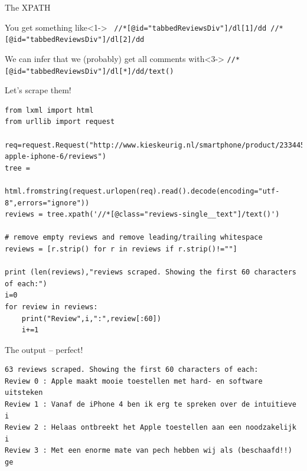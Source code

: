\documentclass{beamer}
\begin{document}
\begin{frame}{The XPATH}
\begin{block}{You get something like}<1->
{\tt{
//*[@id="tabbedReviewsDiv"]/dl[1]/dd
//*[@id="tabbedReviewsDiv"]/dl[2]/dd
}}
\end{block}
\begin{block}{We can infer that we (probably) get all comments with}<3->
{\tt{//*[@id="tabbedReviewsDiv"]/dl[*]/dd/text()}}
\end{block}
\end{frame}




\begin{frame}[fragile]{Let's scrape them!}
\begin{lstlisting}
from lxml import html
from urllib import request

req=request.Request("http://www.kieskeurig.nl/smartphone/product/2334455-apple-iphone-6/reviews")
tree = 

html.fromstring(request.urlopen(req).read().decode(encoding="utf-8",errors="ignore"))        
reviews = tree.xpath('//*[@class="reviews-single__text"]/text()')

# remove empty reviews and remove leading/trailing whitespace
reviews = [r.strip() for r in reviews if r.strip()!=""]

print (len(reviews),"reviews scraped. Showing the first 60 characters of each:")
i=0
for review in reviews:
    print("Review",i,":",review[:60])
    i+=1
\end{lstlisting}
\end{frame}



\begin{frame}[fragile]{The output -- perfect!}
\begin{lstlisting}
63 reviews scraped. Showing the first 60 characters of each:
Review 0 : Apple maakt mooie toestellen met hard- en software uitsteken
Review 1 : Vanaf de iPhone 4 ben ik erg te spreken over de intuitieve i
Review 2 : Helaas ontbreekt het Apple toestellen aan een noodzakelijk i
Review 3 : Met een enorme mate van pech hebben wij als (beschaafd!!) ge
\end{lstlisting}
\end{frame}
\end{document}
